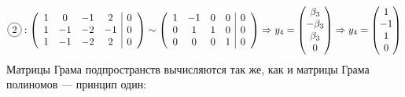 \documentclass{article}
\newcommand*\circled[1]{\tikz[baseline=(char.base)]{
            \node[shape=circle,draw,inner sep=2pt] (char) {#1};}}
\begin{document}
    $$\circled{2}: \left(\begin{array}{cccc|c}
                1 & 0  & -1 & 2  & 0 \\
                1 & -1 & -2 & -1 & 0 \\
                1 & -1 & -2 & 2  & 0
            \end{array}\right) \sim \left(\begin{array}{cccc|c}
                1 & -1 & 0 & 0 & 0 \\
                0 & 1  & 1 & 0 & 0 \\
                0 & 0  & 0 & 1 & 0
            \end{array}\right) \Rightarrow y_4=\begin{pmatrix}
            \beta_3 \\ -\beta_3 \\ \beta_3 \\ 0
        \end{pmatrix} \Rightarrow y_4 = \begin{pmatrix}
            1 \\ -1 \\ 1 \\ 0
        \end{pmatrix}$$
    Матрицы Грама подпространств вычисляются так же, как и матрицы Грама полиномов --- принцип один:
\end{document}
